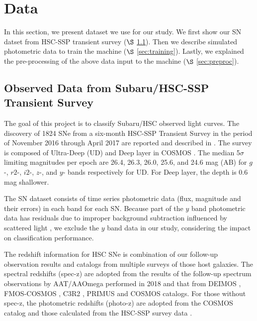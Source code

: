 \documentclass[useamsfonts]{pasj01}
\begin{document}
\section{Data}
In this section, we present dataset we use for our study.
We first show our SN datset from HSC-SSP transient survey ($\S$ \ref{sec:hscdata}).
Then we describe simulated photometric data to train the machine ($\S$ \ref{sec:training}).
Lastly, we explained the pre-processing of the above data input to the machine ($\S$ \ref{sec:preproc}).


\subsection{Observed Data from Subaru/HSC-SSP Transient Survey}
\label{sec:hscdata}
The goal of this project is to classify Subaru/HSC observed light curves. 
The discovery of 1824 SNe from a six-month HSC-SSP Transient Survey in the period of
November 2016 through April 2017 are reported and described in \citet{yasuda19a}.
The survey is composed of Ultra-Deep (UD) and Deep layer in COSMOS \citep{scoville07a}.
The median 5$\sigma$ limiting magnitudes per epoch are 26.4, 26.3, 26.0, 25.6, and 24.6 mag (AB)
for $g$-, $r2$-, $i2$-, $z$-, and $y$- bands respectively for UD. 
For Deep layer, the depth is 0.6 mag shallower.

The SN dataset consists of time series photometric data (flux, magnitude and their errors) in each band for each SN.
Because part of the $y$ band photometric data has residuals due to improper background subtraction influenced by scattered light \citep{aihara18dr},
we exclude the $y$ band data in our study, considering the impact on classification performance.

The redshift information for HSC SNe is combination of our follow-up observation results and catalogs from multiple surveys of those host galaxies.
The spectral redshifts (spec-z) are adopted from the results of the follow-up spectrum observations by AAT/AAOmega performed in 2018 and that from DEIMOS \citep{DEIMOS2018}, FMOS-COSMOS \citep{FMOS-COSMOS2015}, C3R2 \citep{C3R2_2017}, PRIMUS \citep{PRIMUS2011} and COSMOS catalogs.
For those without spec-z, the photometric redshifts (photo-z) are adopted from the COSMOS catalog and those calculated from the HSC-SSP survey data \citep{HSCSSP_photo-z2018}.
\end{document}
